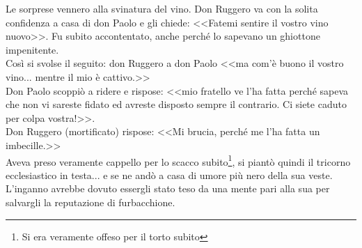 Le sorprese vennero alla svinatura del vino. Don Ruggero va con la solita confidenza a casa di don Paolo e gli chiede: <<Fatemi sentire il vostro vino nuovo>>. Fu subito accontentato, anche perché lo sapevano un ghiottone impenitente. \\
Così si svolse il seguito: don Ruggero a don Paolo <<ma com'è buono il vostro vino... mentre il mio è cattivo.>> \\
Don Paolo scoppiò a ridere e rispose: <<mio fratello ve l'ha fatta perché sapeva che non vi sareste fidato ed avreste disposto sempre il contrario. Ci siete caduto per colpa vostra!>>.\\
Don Ruggero (mortificato) rispose: <<Mi brucia, perché me l'ha fatta un imbecille.>>\\
Aveva preso veramente cappello per lo scacco subito\footnote{Si era veramente offeso per il torto subito}, si piantò quindi il tricorno ecclesiastico in testa... e se ne andò a casa di umore più nero della sua veste.\\
L'inganno avrebbe dovuto essergli stato teso da una mente pari alla sua per salvargli la reputazione di furbacchione.\\